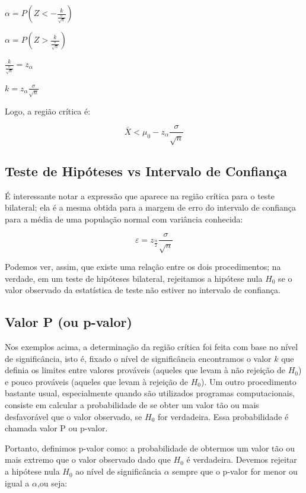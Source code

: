 \documentclass[
]{book}
\begin{document}
\(\alpha=P\left(Z<-\frac{k}{\frac{\sigma}{\sqrt n}}\right)\)

\(\alpha=P\left(Z>\frac{k}{\frac{\sigma}{\sqrt n}}\right)\)

\(\frac{k}{\frac{\sigma}{\sqrt n}}=z_{\alpha}\)

\(k = z_{\alpha}\frac{\sigma}{\sqrt n}\)

Logo, a região crítica é:

\[\bar X < \mu_0-z_{\alpha}\frac{\sigma}{\sqrt n}\]

\hypertarget{teste-de-hipuxf3teses-vs-intervalo-de-confianuxe7a}{%
\subsection{Teste de Hipóteses vs Intervalo de Confiança}\label{teste-de-hipuxf3teses-vs-intervalo-de-confianuxe7a}}

É interessante notar a expressão que aparece na região crítica para o teste bilateral; ela é a mesma obtida para a margem de erro do intervalo de confiança para a média de uma população normal com variância conhecida:

\[\varepsilon=z_{\frac{\alpha}{2}}\frac{\sigma}{\sqrt n}\]

Podemos ver, assim, que existe uma relação entre os dois procedimentos; na verdade, em um teste de hipóteses bilateral, rejeitamos a hipótese nula \(H_0\) se o valor observado da estatística de teste não estiver no intervalo de confiança.

\hypertarget{valor-p-ou-p-valor}{%
\subsection{Valor P (ou p-valor)}\label{valor-p-ou-p-valor}}

Nos exemplos acima, a determinação da região crítica foi feita com base no nível de significância, isto é, fixado o nível de significância encontramos o valor \(k\) que definia os limites entre valores prováveis (aqueles que levam à não rejeição de \(H_0\)) e pouco prováveis (aqueles que levam à rejeição de \(H_0\)). Um outro procedimento bastante usual, especialmente quando são utilizados programas computacionais, consiste em calcular a probabilidade de se obter um valor tão ou mais desfavorável que o valor observado, se \(H_0\) for verdadeira. Essa probabilidade é chamada valor P ou p-valor.

Portanto, definimos p-valor como: a probabilidade de obtermos um valor tão ou mais extremo que o valor observado dado que \(H_0\) é verdadeira. Devemos rejeitar a hipótese nula \(H_0\) ao nível de significância \(\alpha\) sempre que o p-valor for menor ou igual a \(\alpha\),ou seja:
\end{document}
